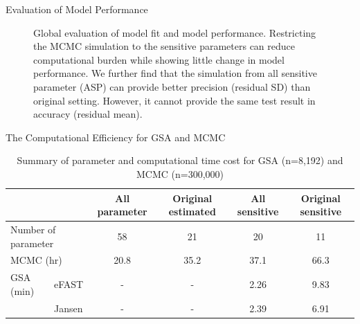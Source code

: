 \documentclass[xcolor=table]{beamer}
\begin{document}
\begin{frame}[t]
\begin{columns}[t]
\begin{column}{0.22\paperwidth}
\begin{block}{Evaluation of Model Performance}
\begin{figure}
\begin{columns}
\caption{Global evaluation of model fit and model performance. Restricting the MCMC simulation to the sensitive parameters can reduce computational burden while showing little change in model performance.
We further find that the simulation from all sensitive parameter (ASP) can provide better precision (residual SD) than original setting.
However, it cannot provide the same test result in accuracy (residual mean). }
\label{fig:example right}
\end{columns}
\end{figure}
\end{block}
%
\begin{block}{The Computational Efficiency for GSA and MCMC}
\begin{table}
\begin{adjustbox}{max width=\textwidth}
\begin{threeparttable}
  \centering
  \caption{Summary of parameter and computational time cost for GSA (n=8,192) and MCMC (n=300,000)}
  \label{tab:table1}
  \begin{tabular}{llcccc}
  \rowcolor{Maroon!30}   
    \toprule
    &  & All parameter & Original estimated & All sensitive & Original sensitive \\
    \midrule
    \multicolumn{2}{l}{Number of parameter} & 58 & 21 & 20 & 11 \\
    \multicolumn{2}{l}{MCMC (hr)} & 20.8 & 35.2 & 37.1 & 66.3 \\
	    GSA (min) & eFAST & - & - & 2.26 & 9.83 \\
	   \multirow{2}{*}{} & Jansen & - & - & 2.39 & 6.91 \\

\end{tabular}
\end{threeparttable}
\end{adjustbox}
\end{table}
\end{block}
\end{column}
\end{columns}
\end{frame}
\end{document}
